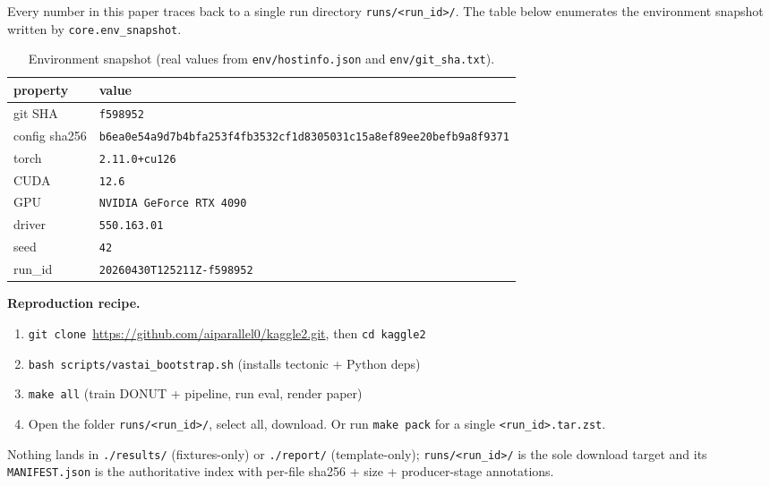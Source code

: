 \documentclass[conference]{IEEEtran}
\begin{document}
Every number in this paper traces back to a single run directory
\texttt{runs/<run\_id>/}.  The table below enumerates the environment
snapshot written by \texttt{core.env\_snapshot}.

\begin{table}[t]
\centering
\caption{Environment snapshot (real values from
         \texttt{env/hostinfo.json} and \texttt{env/git\_sha.txt}).}
\label{tab:env}
\small
\begin{tabular}{ll}
\toprule
property & value \\
\midrule
git SHA & \texttt{f598952} \\
config sha256 & \texttt{b6ea0e54a9d7b4bfa253f4fb3532cf1d8305031c15a8ef89ee20befb9a8f9371} \\
torch & \texttt{2.11.0+cu126} \\
CUDA & \texttt{12.6} \\
GPU & \texttt{NVIDIA GeForce RTX 4090} \\
driver & \texttt{550.163.01} \\
seed & \texttt{42} \\
run\_id & \texttt{20260430T125211Z-f598952} \\
\bottomrule
\end{tabular}
\end{table}

\noindent\textbf{Reproduction recipe.}
{\sloppy
\begin{enumerate}
    \item \texttt{git clone}~\url{https://github.com/aiparallel0/kaggle2.git},
          then \texttt{cd kaggle2}
    \item \texttt{bash scripts/vastai\_bootstrap.sh}  (installs tectonic + Python deps)
    \item \texttt{make all}  (train DONUT + pipeline, run eval, render paper)
    \item Open the folder \texttt{runs/<run\_id>/}, select all, download.
          Or run \texttt{make pack} for a single \texttt{<run\_id>.tar.zst}.
\end{enumerate}
\par}
Nothing lands in \texttt{./results/} (fixtures-only) or \texttt{./report/}
(template-only); \texttt{runs/<run\_id>/} is the sole download target and
its \texttt{MANIFEST.json} is the authoritative index with per-file
sha256 + size + producer-stage annotations.




\end{document}
